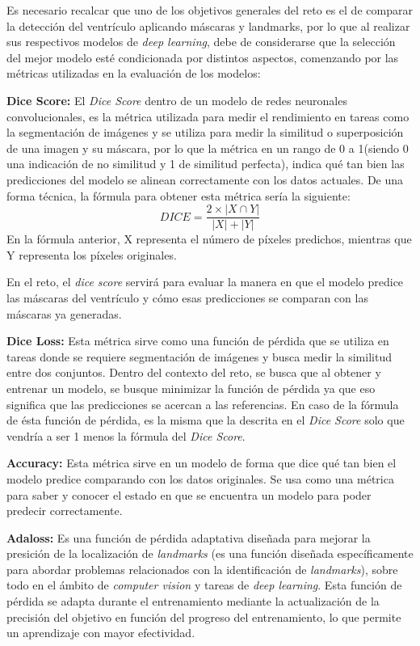 \documentclass[runningheads]{llncs}
\begin{document}
Es necesario recalcar que uno de los objetivos generales del reto es el de comparar la detección del ventrículo aplicando máscaras y landmarks, por lo que al realizar sus respectivos modelos de \textit{deep learning}, debe de considerarse que la selección del mejor modelo esté condicionada por distintos aspectos, comenzando por las métricas utilizadas en la evaluación de los modelos:

\textbf{Dice Score:} El \textit{Dice Score} dentro de un modelo de redes neuronales convolucionales, es la métrica utilizada para medir el rendimiento en tareas como la segmentación de imágenes y se utiliza para medir la similitud o superposición de una imagen y su máscara, por lo que la métrica en un rango de 0 a 1(siendo 0 una indicación de no similitud y 1 de similitud perfecta), indica qué tan bien las predicciones del modelo se alinean correctamente con los datos actuales. De una forma técnica, la fórmula para obtener esta métrica sería la siguiente: \begin{equation}
    DICE = \frac{2 \times |X \cap Y|}{|X| + |Y|}
\end{equation}
En la fórmula anterior, X representa el número de píxeles predichos, mientras que Y representa los píxeles originales. \citep{researchgate}

En el reto, el \textit{dice score} servirá para evaluar la manera en que el modelo predice las máscaras del ventrículo y cómo esas predicciones se comparan con las máscaras ya generadas. 

\textbf{Dice Loss:}  Esta métrica sirve como una función de pérdida que se utiliza en tareas donde se requiere segmentación de imágenes y busca medir la similitud entre dos conjuntos. Dentro del contexto del reto, se busca que al obtener y entrenar un modelo, se busque minimizar la función de pérdida ya que eso significa que las predicciones se acercan a las referencias. En caso de la fórmula de ésta función de pérdida, es la misma que la descrita en el \textit{Dice Score} solo que vendría a ser 1 menos la fórmula del \textit{Dice Score}.

\textbf{Accuracy:} Esta métrica sirve en un modelo de forma que dice qué tan bien el modelo predice comparando con los datos originales. Se usa como una métrica para saber y conocer el estado en que se encuentra un modelo para poder predecir correctamente. \citep{gad2021deepmetrics}

\textbf{Adaloss: } Es una función de pérdida adaptativa diseñada para mejorar la presición de la localización de \textit{landmarks} (es una función diseñada específicamente para abordar problemas relacionados con la identificación de \textit{landmarks}), sobre todo en el ámbito de \textit{computer vision} y tareas de \textit{deep learning}. Esta función de pérdida se adapta durante el entrenamiento mediante la actualización de la precisión del objetivo en función del progreso del entrenamiento, lo que permite un aprendizaje con mayor efectividad. \citep{teixeira2019adaloss}
\end{document}
